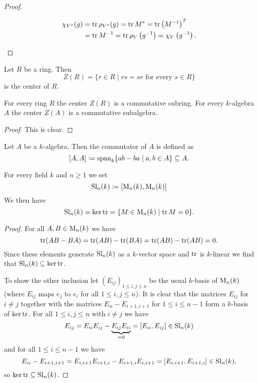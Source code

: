 \begin{proof}
\begin{enumerate}[label=\emph{\alph*})]
   \begin{align*}
    \chi_{V^*}(g)
    &= \operatorname{tr} \rho_{V^*}(g)
    = \operatorname{tr} M^*
    = \operatorname{tr} \left(M^{-1}\right)^T \\
    &= \operatorname{tr} M^{-1}
    = \operatorname{tr} \rho_V\left( g^{-1} \right)
    = \chi_V\left( g^{-1} \right).
    \qedhere
   \end{align*}
 \end{enumerate}
\end{proof}


\begin{defi}
 Let $R$ be a ring. Then
 \[
  Z(R) = \{r \in R \mid rs = sr \text{ for every } s \in R\}
 \]
 is the center of $R$.
\end{defi}


\begin{lem}
 For every ring $R$ the center $Z(R)$ is a commutative subring. For every $k$-algebra $A$ the center $Z(A)$ is a commutative subalgebra.
\end{lem}
\begin{proof}
 This is clear.
\end{proof}


\begin{defi}
 Let $A$ be a $k$-algebra. Then the commutator of $A$ is defined as
 \[
  [A,A] \coloneqq \operatorname{span}_k \{ab-ba \mid a,b \in A\} \subseteq A.
 \]
\end{defi}


\begin{expl}
 For every field $k$ and $n \geq 1$ we set
 \[
  \operatorname{Sl}_n(k) \coloneqq [\operatorname{M}_n(k), \operatorname{M}_n(k)]
 \]
 We then have
 \[
  \operatorname{Sl}_n(k) = \ker \operatorname{tr} = \{M \in \operatorname{M}_n(k) \mid \operatorname{tr} M = 0\}.
 \]
 \begin{proof}
  For all $A, B \in \operatorname{M}_n(k)$ we have
  \[
   \operatorname{tr}(AB-BA) = \operatorname{tr}(AB)-\operatorname{tr}(BA) = \operatorname{tr}(AB)-\operatorname{tr}(AB) = 0.
  \]
  Since these elements generate $\operatorname{Sl}_n(k)$ as a $k$-vector space and $\operatorname{tr}$ is $k$-linear we find that $\operatorname{Sl}_n(k) \subseteq \ker \operatorname{tr}$.
  
  To show the other inclusion let $(E_{ij})_{1 \leq i,j \leq n}$ be the usual $k$-basis of $\operatorname{M}_n(k)$ (where $E_{ij}$ maps $e_j$ to $e_i$ for all $1 \leq i,j \leq n)$. It is clear that the matrices $E_{ij}$ for $i \neq j$ together with the matrices $E_{ii}-E_{i+1,i+1}$ for $1 \leq i \leq n-1$ form a $k$-basis of $\ker \operatorname{tr}$. For all $1 \leq i,j \leq n$ with $i \neq j$ we have
  \[
   E_{ij} = E_{ii} E_{ij} - \underbrace{E_{ij} E_{ii}}_{=0} = [E_{ii}, E_{ij}] \in \operatorname{Sl}_n(k)
  \]
  and for all $1 \leq i \leq n-1$ we have
  \[
   E_{ii} - E_{i+1,i+1} = E_{i,i+1} E_{i+1,i} - E_{i+1,i} E_{i,i+1} = [E_{i,i+1}, E_{i+1,i}] \in \operatorname{Sl}_n(k),
  \]
  so $\ker \operatorname{tr} \subseteq \operatorname{Sl}_n(k)$.
 \end{proof}
\end{expl}


